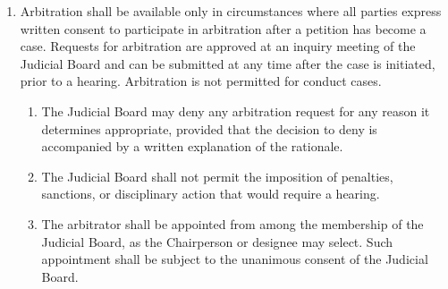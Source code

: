 \begin{enumerate}
\begin{enumerate}
      \item Dismissal: After a judicious review of case materials and ensuring jurisprudential propriety, the Board may dismiss a case when warranted by evidence or procedural considerations. In such instances, the Board must provide a written rationale detailing the grounds for dismissal. Dismissal shall not be exercised in a manner that obstructs justice, restricts the rights of complainants, or silences their grievances.
        \begin{enumerate}
          \item Dismissals are appealable to the Review Board, which may direct the Judicial Board to hear the case, hear the case themselves, or exercise their appellate authority in any fashion deemed appropriate.
        \end{enumerate}
      \item Verdict: In concluding a hearing, a verdict is issued. Verdicts are binding, and the conclusions on the relevant matters are enforceable by sanctions.
        \begin{enumerate}
          \item After issuing a verdict, the Judicial Board shall write an assenting and a dissenting opinion, if they are not in unanimous agreement, explaining their decision on the case. Such opinions shall be considered public record and shall be delivered directly to all Union bodies and campus publications.
        \end{enumerate}
    \end{enumerate}
  \item Arbitration shall be available only in circumstances where all parties express written consent to participate in arbitration after a petition has become a case. Requests for arbitration are approved at an inquiry meeting of the Judicial Board and can be submitted at any time after the case is initiated, prior to a hearing. Arbitration is not permitted for conduct cases.
    \begin{enumerate}
      \item The Judicial Board may deny any arbitration request for any reason it determines appropriate, provided that the decision to deny is accompanied by a written explanation of the rationale.
      \item The Judicial Board shall not permit the imposition of penalties, sanctions, or disciplinary action that would require a hearing.
      \item The arbitrator shall be appointed from among the membership of the Judicial Board, as the Chairperson or designee may select. Such appointment shall be subject to the unanimous consent of the Judicial Board.

\end{enumerate}
\end{enumerate}
